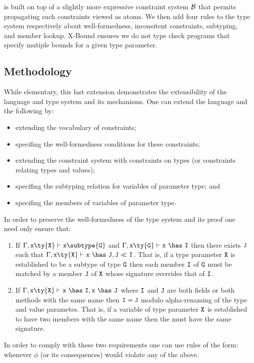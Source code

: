  is built on top of a slightly more expressive
constraint system $\cal B$ that permits propagating such
constraints viewed as atoms. We then
add four rules to the type system respectively about
well-formedness, inconsitent constraints, subtyping, and member
lookup. {\sc X-Bound} ensures we do not type check programs
that specify mutiple bounds for a given type
parameter.%

\subsection{Methodology}

While elementary, this last extension demonstrates the extensibility of the \FXGL{\cdot} language and type system and its mechanisms. One can extend the \FXGL{\cdot} language and the following by:
\begin{itemize}
\item extending the vocabulary of constraints;
\item specifing the well-formedness conditions for these constraints;
\item extending the constraint system with constraints on types (or constraints relating types and values);
\item specifing the subtyping relation for variables of parameter type; and
\item specifing the members of variables of parameter type.
\end{itemize}

In order to preserve the well-formedness of the type system and its proof one need only ensure that:
\begin{enumerate}
\item If $\Gamma,{\tt x}\ty{\tt X}\vdash{\tt x}\subtype{\tt G}$ and $\Gamma,{\tt x}\ty{\tt G}\vdash{\tt x}~\has~{\tt I}$ then there exists $\tt J$ such that $\Gamma,{\tt x}\ty{\tt X}\vdash{\tt x}~\has~{\tt J}, {\tt J} \ll {\tt I}$. That is, if a type parameter $\tt X$ is established to be a subtype of type $\tt G$ then each member $\tt I$ of $\tt G$ must be matched by a member $\tt J$ of $\tt X$ whose signature overrides that of $\tt I$.

\item If $\Gamma,{\tt x}\ty{\tt X}\vdash{\tt x}~\has~{\tt I},{\tt x}~\has~{\tt J}$ where $\tt I$ and $\tt J$ are both fields or both methods with the same name then ${\tt I}={\tt J}$ modulo alpha-renaming of the type and value parametes. That is, if a variable of type parameter $\tt X$ is established to have two members with the same name then the must have the same signature.
\end{enumerate}
In order to comply with these two requirements one can use rules of the form:
\infrule {\Gamma\vdash \phi}{\Gamma\vdash\false} whenever $\phi$ (or its consequences) would violate any of the above.

